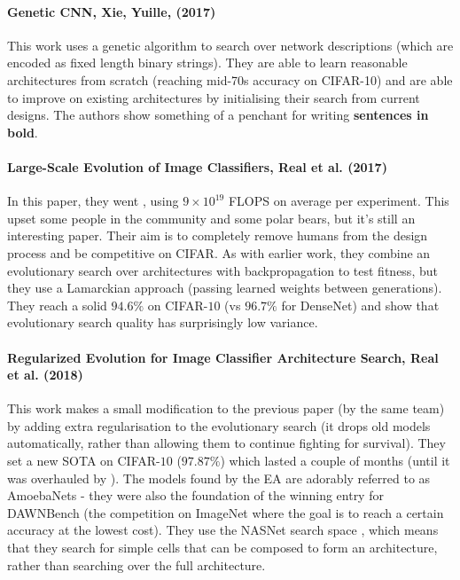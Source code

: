 \documentclass[10pt]{article}
\begin{document}
\paragraph{Genetic CNN, Xie, Yuille, (2017) \cite{xie2017genetic}} This work uses a genetic algorithm to search over network descriptions (which are encoded as fixed length binary strings). They are able to learn reasonable architectures from scratch (reaching mid-70s accuracy on CIFAR-10) and are able to improve on existing architectures by initialising their search from current designs. The authors show something of a penchant for writing \textbf{sentences in bold}.

\paragraph{Large-Scale Evolution of Image Classifiers, Real et al. (2017)\cite{real2017large}}  In this paper, they went , using $9 \times 10^{19}$ FLOPS on average per experiment.  This upset some people in the community and some polar bears, but it's still an interesting paper.  Their aim is to completely remove humans from the design process and be competitive on CIFAR.  As with earlier work, they combine an evolutionary search over architectures with backpropagation to test fitness, but they use a Lamarckian approach (passing learned weights between generations).  They reach a solid $94.6\%$ on CIFAR-$10$ (vs $96.7\%$ for DenseNet) and show that evolutionary search quality has surprisingly low variance. 

\paragraph{Regularized Evolution for Image Classifier Architecture Search, Real et al. (2018) \cite{real2018regularized}}  This work makes a small modification to the previous paper (by the same team) by adding extra regularisation to the evolutionary search (it drops old models automatically, rather than allowing them to continue fighting for survival).  They set a new SOTA on CIFAR-$10$ ($97.87\%$) which lasted a couple of months (until it was overhauled by \cite{cubuk2018autoaugment}).  The models found by the EA are adorably referred to as AmoebaNets - they were also the foundation of the winning entry for DAWNBench (the competition on ImageNet where the goal is to reach a certain accuracy at the lowest cost).  They use the NASNet search space \cite{zoph2017learning}, which means that they search for simple cells that can be composed to form an architecture, rather than searching over the full architecture. 
\end{document}
